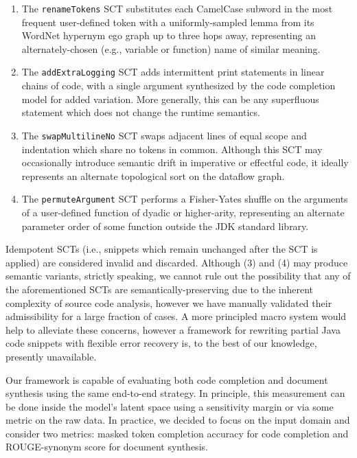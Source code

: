 \documentclass{article} %
\begin{document}
\begin{enumerate}[itemsep=1ex]
  \item The \lstinline|renameTokens| SCT substitutes each CamelCase subword in the most frequent user-defined token with a uniformly-sampled lemma from its WordNet hypernym ego graph up to three hops away, representing an alternately-chosen (e.g., variable or function) name of similar meaning.
  \item The \lstinline|addExtraLogging| SCT adds intermittent print statements in linear chains of code, with a single argument synthesized by the code completion model for added variation. More generally, this can be any superfluous statement which does not change the runtime semantics.
  \item The \lstinline|swapMultilineNo| SCT swaps adjacent lines of equal scope and indentation which share no tokens in common. Although this SCT may occasionally introduce semantic drift in imperative or effectful code, it ideally represents an alternate topological sort on the dataflow graph.
  \item The \lstinline|permuteArgument| SCT performs a Fisher-Yates shuffle on the arguments of a user-defined function of dyadic or higher-arity, representing an alternate parameter order of some function outside the JDK standard library.
\end{enumerate}

Idempotent SCTs (i.e., snippets which remain unchanged after the SCT is applied) are considered invalid and discarded. Although (3) and (4) may produce semantic variants, strictly speaking, we cannot rule out the possibility that any of the aforementioned SCTs are semantically-preserving due to the inherent complexity of source code analysis, however we have manually validated their admissibility for a large fraction of cases. A more principled macro system would help to alleviate these concerns, however a framework for rewriting partial Java code snippets with flexible error recovery is, to the best of our knowledge, presently unavailable.

Our framework is capable of evaluating both code completion and document synthesis using the same end-to-end strategy. In principle, this measurement can be done inside the model's latent space using a sensitivity margin or via some metric on the raw data. In practice, we decided to focus on the input domain and consider two metrics: masked token completion accuracy for code completion and ROUGE-synonym score for document synthesis.
\end{document}
